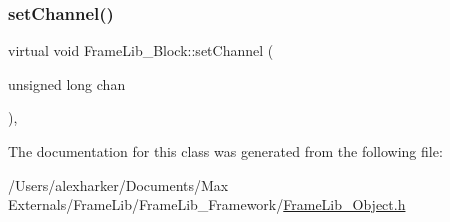 \mbox{\label{class_frame_lib___block_a730aaf9204244afd2c40da0c40bb1ba8}} 
\subsubsection{\texorpdfstring{set\+Channel()}{setChannel()}}
{\footnotesize\ttfamily virtual void Frame\+Lib\+\_\+\+Block\+::set\+Channel (\begin{DoxyParamCaption}\item[{unsigned long}]{chan }\end{DoxyParamCaption})\hspace{0.3cm}{\ttfamily [inline]}, {\ttfamily [virtual]}}



The documentation for this class was generated from the following file\+:\begin{DoxyCompactItemize}
\item 
/\+Users/alexharker/\+Documents/\+Max Externals/\+Frame\+Lib/\+Frame\+Lib\+\_\+\+Framework/\hyperlink{_frame_lib___object_8h}{Frame\+Lib\+\_\+\+Object.\+h}\end{DoxyCompactItemize}
